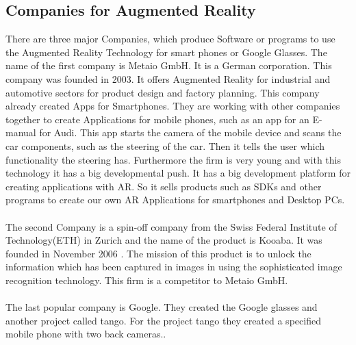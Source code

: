  \subsection{Companies for Augmented Reality}
 There are three major Companies, which produce Software or programs to use the Augmented Reality Technology for smart phones or Google Glasses.  The name of the first company is Metaio GmbH. It is a German corporation. This company was founded in 2003. It offers Augmented Reality for industrial and automotive sectors for product design and factory planning. This company already created Apps for Smartphones. They are working with other companies together to create Applications for mobile phones, such as an app for an E-manual for  Audi. This app  starts the camera of the mobile device and scans the car components, such as the steering of the car. Then it tells the user which functionality the steering has. Furthermore the firm is very young and with this technology it has a big developmental push. It has a big development platform for creating applications with AR. So it sells products such as SDKs and other programs to create our own AR Applications for smartphones and Desktop PCs.
 \\
 \\
 The second Company is a spin-off company from the Swiss Federal Institute of Technology(ETH) in Zurich and the name of  the product is Kooaba. It was founded  in November 2006 . The mission of this product is to unlock the information which has been captured in images in using the sophisticated image recognition technology. This firm is a competitor to Metaio GmbH.
 \\
 \\ 
 The last popular company is Google. They created the Google glasses and another project called tango.  For the project tango they created a specified mobile phone with two back cameras..
 \\
 \\
 

